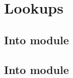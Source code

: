 \section{Lookups}                            \label{rlp utils: lookups}
\subsection{Into \wcpMod{} module}           \label{rlp utils: lookups: rlp utils into wcp}           
\subsection{Into \shfMod{} module}           \label{rlp utils: lookups: rlp utils into shf}           
